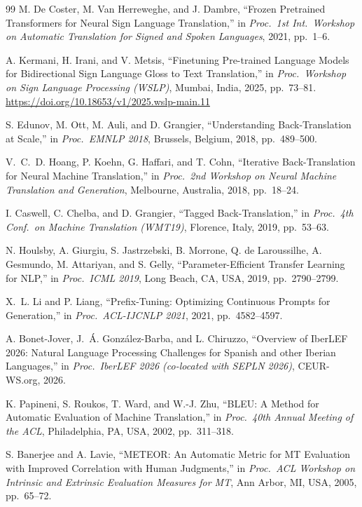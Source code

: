 \documentclass[sigconf,screen]{ceurart}
\begin{document}
\begin{thebibliography}{99}
M. De Coster, M. Van Herreweghe, and J. Dambre,
``Frozen Pretrained Transformers for Neural Sign Language Translation,''
in \textit{Proc.\ 1st Int.\ Workshop on Automatic Translation for
Signed and Spoken Languages}, 2021, pp.~1--6.

A. Kermani, H. Irani, and V. Metsis,
``Finetuning Pre-trained Language Models for Bidirectional Sign
Language Gloss to Text Translation,''
in \textit{Proc.\ Workshop on Sign Language Processing (WSLP)},
Mumbai, India, 2025, pp.~73--81.
\url{https://doi.org/10.18653/v1/2025.wslp-main.11}

S. Edunov, M. Ott, M. Auli, and D. Grangier,
``Understanding Back-Translation at Scale,''
in \textit{Proc.\ EMNLP 2018}, Brussels, Belgium, 2018, pp.~489--500.

V.\ C.\ D. Hoang, P. Koehn, G. Haffari, and T. Cohn,
``Iterative Back-Translation for Neural Machine Translation,''
in \textit{Proc.\ 2nd Workshop on Neural Machine Translation
and Generation}, Melbourne, Australia, 2018, pp.~18--24.

I. Caswell, C. Chelba, and D. Grangier,
``Tagged Back-Translation,''
in \textit{Proc.\ 4th Conf.\ on Machine Translation (WMT19)},
Florence, Italy, 2019, pp.~53--63.

N. Houlsby, A. Giurgiu, S. Jastrzebski, B. Morrone,
Q. de Laroussilhe, A. Gesmundo, M. Attariyan, and S. Gelly,
``Parameter-Efficient Transfer Learning for NLP,''
in \textit{Proc.\ ICML 2019}, Long Beach, CA, USA, 2019,
pp.~2790--2799.

X.\ L. Li and P. Liang,
``Prefix-Tuning: Optimizing Continuous Prompts for Generation,''
in \textit{Proc.\ ACL-IJCNLP 2021}, 2021, pp.~4582--4597.

A. Bonet-Jover, J.\ \'A. Gonz\'alez-Barba, and L. Chiruzzo,
``Overview of IberLEF 2026: Natural Language Processing Challenges
for Spanish and other Iberian Languages,''
in \textit{Proc.\ IberLEF 2026 (co-located with SEPLN 2026)},
CEUR-WS.org, 2026.

K. Papineni, S. Roukos, T. Ward, and W.-J. Zhu,
``BLEU: A Method for Automatic Evaluation of Machine Translation,''
in \textit{Proc.\ 40th Annual Meeting of the ACL},
Philadelphia, PA, USA, 2002, pp.~311--318.

S. Banerjee and A. Lavie,
``METEOR: An Automatic Metric for MT Evaluation with Improved
Correlation with Human Judgments,''
in \textit{Proc.\ ACL Workshop on Intrinsic and Extrinsic Evaluation
Measures for MT}, Ann Arbor, MI, USA, 2005, pp.~65--72.


\end{thebibliography}
\end{document}
